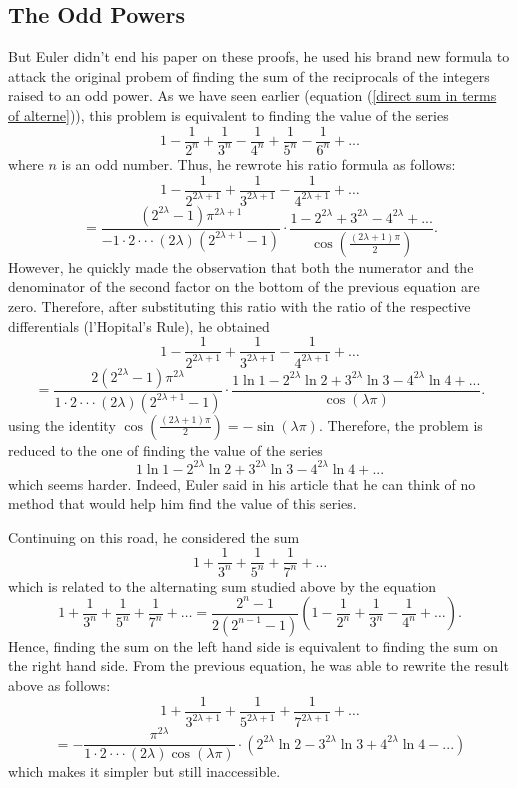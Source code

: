 \subsection*{The Odd Powers}

But Euler didn't end his paper on these proofs, he used his brand new formula to attack the original probem of finding the sum of the reciprocals of the integers raised to an odd power. As we have seen earlier (equation (\ref{direct sum in terms of alterne})), this problem is equivalent to finding the value of the series
$$1 - \frac{1}{2^n} + \frac{1}{3^n} - \frac{1}{4^n} + \frac{1}{5^n} - \frac{1}{6^n} + ...$$
where $n$ is an odd number. Thus, he rewrote his ratio formula as follows:
$$1 - \frac{1}{2^{2\lambda + 1}} + \frac{1}{3^{2\lambda + 1}} - \frac{1}{4^{2\lambda + 1}} + \dots $$
$$= \frac{(2^{2\lambda} - 1)\pi^{2\lambda + 1}}{-1\cdot 2 \cdot \cdot \cdot (2\lambda)(2^{2\lambda + 1} - 1)} \cdot \frac{1 - 2^{2\lambda} + 3^{2\lambda} - 4^{2\lambda}+ ...}{\cos(\frac{(2\lambda + 1)\pi}{2})}.$$
However, he quickly made the observation that both the numerator and the denominator of the second factor on the bottom of the previous equation are zero. Therefore, after substituting this ratio with the ratio of the respective differentials (l'Hopital's Rule), he obtained 
$$1 - \frac{1}{2^{2\lambda + 1}} + \frac{1}{3^{2\lambda + 1}} - \frac{1}{4^{2\lambda + 1}} + \dots$$
$$= \frac{2(2^{2\lambda} - 1)\pi^{2\lambda}}{1\cdot 2 \cdot \cdot \cdot (2\lambda)(2^{2\lambda + 1} - 1)} \cdot \frac{1\ln 1 - 2^{2\lambda}\ln 2 + 3^{2\lambda}\ln 3 - 4^{2\lambda}\ln 4+ ...}{\cos(\lambda \pi)}.$$
using the identity $\cos(\frac{(2\lambda + 1)\pi}{2}) = -\sin(\lambda \pi)$. Therefore, the problem is reduced to the one of finding the value of the series
$$1\ln 1 - 2^{2\lambda}\ln 2 + 3^{2\lambda}\ln 3 - 4^{2\lambda}\ln 4+ ...$$
which seems harder. Indeed, Euler said in his article that he can think of no method that would help him find the value of this series. 

Continuing on this road, he considered the sum
$$1 + \frac{1}{3^n} + \frac{1}{5^n} + \frac{1}{7^n} + \dots$$
which is related to the alternating sum studied above by the equation
$$1 + \frac{1}{3^n} + \frac{1}{5^n} + \frac{1}{7^n} + \dots = \frac{2^n - 1}{2(2^{n-1} - 1)}\left(1 - \frac{1}{2^n} + \frac{1}{3^n} - \frac{1}{4^n} + \dots\right).$$
Hence, finding the sum on the left hand side is equivalent to finding the sum on the right hand side. From the previous equation, he was able to rewrite the result above as follows:
$$1 + \frac{1}{3^{2\lambda + 1}} + \frac{1}{5^{2\lambda + 1}} + \frac{1}{7^{2\lambda + 1}} + \dots $$
$$= -\frac{\pi^{2\lambda}}{1\cdot 2 \cdot \cdot \cdot (2\lambda)\cos(\lambda \pi)} \cdot (2^{2\lambda}\ln 2 - 3^{2\lambda}\ln 3 + 4^{2\lambda}\ln 4 - ...)$$
which makes it simpler but still inaccessible.

